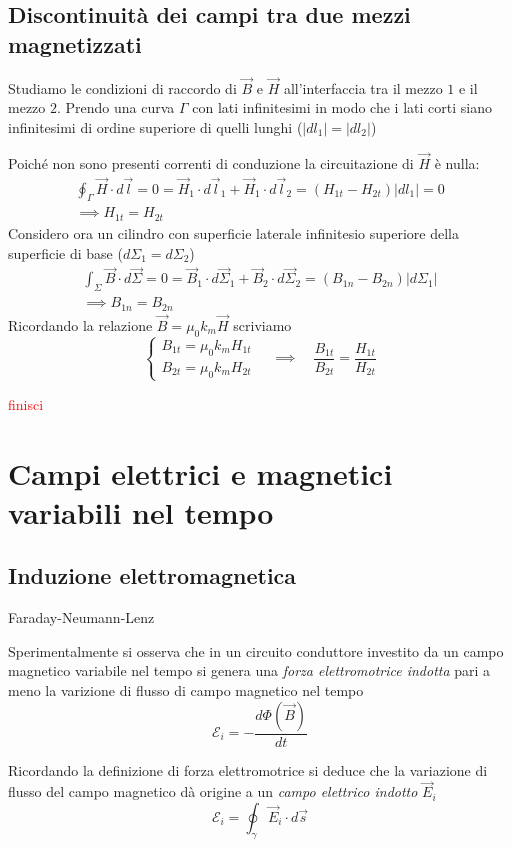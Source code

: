 \documentclass[x11names]{report}
\newcommand{\teorema}[2]{
	\begin{center}
		\fboxsep11pt
		\colorbox{myred}{\begin{minipage}{5.75in}
				\begin{redes}{#1}
					#2
				\end{redes}
		\end{minipage}}
	\end{center}
}
\begin{document}
\subsection{Discontinuità dei campi tra due mezzi magnetizzati}
Studiamo le condizioni di raccordo di \(\vec{B}\) e \(\vec{H}\) all'interfaccia tra il mezzo \(1\) e il mezzo \(2\). Prendo una curva \(\Gamma\) con lati infinitesimi in modo che i lati corti siano infinitesimi di ordine superiore di quelli lunghi (\(|dl_1| = |dl_2|\))

Poiché non sono presenti correnti di conduzione la circuitazione di \(\vec{H}\) è nulla:
\begin{gather*}
	\oint_\Gamma \vec{H} \cdot d\vec{l} = 0 = \vec{H}_1 \cdot d\vec{l}_1 + \vec{H}_1 \cdot d\vec{l}_2 = (H_{1t} - H_{2t})|dl_1| = 0 \\
	\implies H_{1t} = H_{2t}
\end{gather*}
Considero ora un cilindro con superficie laterale infinitesio superiore della superficie di base (\(d\Sigma_1 = d\Sigma_2\))
\begin{gather*}
	\int_\Sigma \vec{B} \cdot d\vec{\Sigma} = 0 = \vec{B}_1 \cdot d\vec{\Sigma}_1 + \vec{B}_2 \cdot d\vec{\Sigma}_2 = (B_{1n} - B_{2n}) |d\Sigma_1| \\
	\implies B_{1n} = B_{2n}
\end{gather*}
Ricordando la relazione \(\vec{B} = \mu_0 k_m \vec{H}\) scriviamo
\[
\begin{cases}
	B_{1t} = \mu_0 k_m H_{1t} \\
	B_{2t} = \mu_0 k_m H_{2t}
\end{cases} \quad \implies \quad
\frac{B_{1t}}{B_{2t}} = \frac{H_{1t}}{H_{2t}}
\]

\textcolor{red}{finisci}



\section{Campi elettrici e magnetici variabili nel tempo}
\subsection{Induzione elettromagnetica}
\teorema{Faraday-Neumann-Lenz}{
Sperimentalmente si osserva che in un circuito conduttore investito da un campo magnetico variabile nel tempo si genera una \textit{forza elettromotrice indotta} pari a meno la varizione di flusso di campo magnetico nel tempo
\begin{equation}
	\mathcal{E}_i = -\frac{d\Phi(\vec{B})}{dt}
\end{equation}}
Ricordando la definizione di forza elettromotrice si deduce che la variazione di flusso del campo magnetico dà origine a un \textit{campo elettrico indotto} \(\vec{E}_i\)
\[
\mathcal{E}_i = \oint_\gamma \vec{E}_i \cdot d\vec{s}
\]
\end{document}
